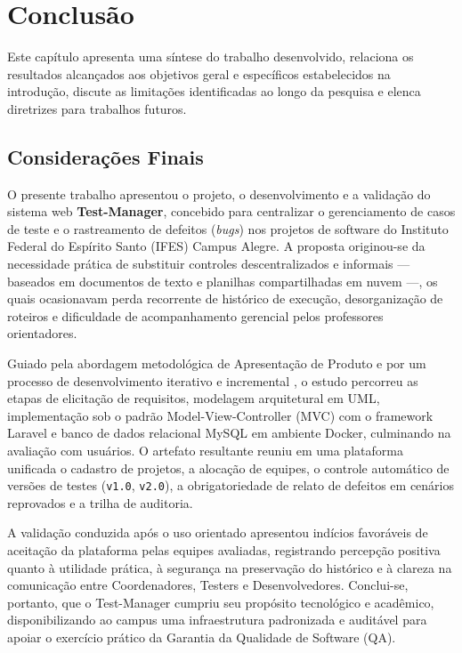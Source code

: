 \chapter{Conclusão}

Este capítulo apresenta uma síntese do trabalho desenvolvido, relaciona os resultados alcançados aos objetivos geral e específicos estabelecidos na introdução, discute as limitações identificadas ao longo da pesquisa e elenca diretrizes para trabalhos futuros.

\section{Considerações Finais}

O presente trabalho apresentou o projeto, o desenvolvimento e a validação do sistema web \textbf{Test-Manager}, concebido para centralizar o gerenciamento de casos de teste e o rastreamento de defeitos (\textit{bugs}) nos projetos de software do Instituto Federal do Espírito Santo (IFES) Campus Alegre. A proposta originou-se da necessidade prática de substituir controles descentralizados e informais --- baseados em documentos de texto e planilhas compartilhadas em nuvem ---, os quais ocasionavam perda recorrente de histórico de execução, desorganização de roteiros e dificuldade de acompanhamento gerencial pelos professores orientadores.

Guiado pela abordagem metodológica de Apresentação de Produto \cite{wazlawick2019} e por um processo de desenvolvimento iterativo e incremental \cite{pressman2016, sommerville2019}, o estudo percorreu as etapas de elicitação de requisitos, modelagem arquitetural em UML, implementação sob o padrão Model-View-Controller (MVC) com o framework Laravel e banco de dados relacional MySQL em ambiente Docker, culminando na avaliação com usuários. O artefato resultante reuniu em uma plataforma unificada o cadastro de projetos, a alocação de equipes, o controle automático de versões de testes (\texttt{v1.0}, \texttt{v2.0}), a obrigatoriedade de relato de defeitos em cenários reprovados e a trilha de auditoria.

A validação conduzida após o uso orientado apresentou indícios favoráveis de aceitação da plataforma pelas equipes avaliadas, registrando percepção positiva quanto à utilidade prática, à segurança na preservação do histórico e à clareza na comunicação entre Coordenadores, Testers e Desenvolvedores. Conclui-se, portanto, que o Test-Manager cumpriu seu propósito tecnológico e acadêmico, disponibilizando ao campus uma infraestrutura padronizada e auditável para apoiar o exercício prático da Garantia da Qualidade de Software (QA).

